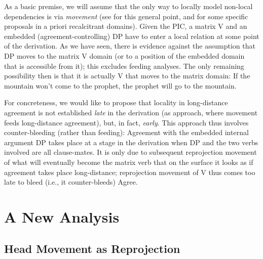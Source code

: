 \documentclass[output=paper
,modfonts
,nonflat]{langsci/langscibook}
\begin{document}
As a basic premise, we will assume that the only way to locally model
non-local dependencies is via {\it movement} (see
\cite{Hornstein:01,Hornstein:09} for this general point, and
\cite{Mueller:14:buf} for some specific proposals in a priori
recalcitrant domains). Given the PIC, a matrix V and an embedded
(agreement-controlling) DP have to enter a local relation at some
point of the derivation. As we have seen, there is evidence against
the assumption that DP moves to the matrix V domain (or to a position
of the embedded domain that is accessible from it); this excludes feeding
analyses. The only remaining possibility then is that it is actually
V that moves to the matrix domain: If the mountain won't come to the
prophet, the prophet will go to the mountain.

For concreteness, we would like to propose that locality in
long-distance agreement is not established {\it late} in the
derivation (as  approach, where
movement feeds long-distance agreement), but, in fact, {\it
  early}. This approach thus involves counter-bleeding (rather than
feeding): Agreement with the embedded internal argument DP takes place
at a stage in the derivation when DP and the two verbs involved are
all clause-mates. It is only due to subsequent reprojection movement
of what will eventually become the matrix verb 
 that on the surface it looks as if agreement takes place
long-distance; reprojection movement of V thus comes too late to bleed
(i.e., it counter-bleeds) Agree.


\section{A New Analysis}

\subsection{Head Movement as Reprojection}
\end{document}
